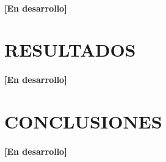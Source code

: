 \documentclass[10pt, twocolumn]{article}
\begin{document}
\paragraph{[En desarrollo]}

\section{RESULTADOS}
\paragraph{[En desarrollo]}

\section{CONCLUSIONES}
\paragraph{[En desarrollo]}



\end{document}
